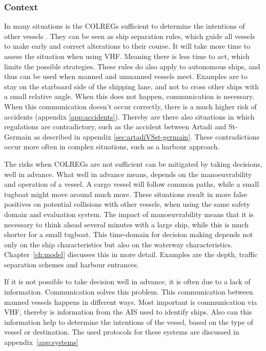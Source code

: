 \subsubsection*{Context}
In many situations is the \acf{COLREGs} sufficient to determine the intentions of other vessels \cite{IMO1972}. They can be seen as ship separation rules, which guide all vessels to make early and correct alterations to their course. It will take more time to assess the situation when using \ac{VHF}. Meaning there is less time to act, which limits the possible strategies. These rules do also apply to autonomous ships, and thus can be used when manned and unmanned vessels meet.
Examples are to stay on the starboard side of the shipping lane, and not to cross other ships with a small relative angle. When this does not happen, communication is necessary. When this communication doesn't occur correctly, there is a much higher risk of accidents (appendix \ref{app:accidents}). Thereby are there also situations in which regulations are contradictory, such as the accident between Artadi and St-Germain as described in appendix \ref{sec:artadiVSst-germain}. These contradictions occur more often in complex situations, such as a harbour approach.

The risks when \ac{COLREGs} are not sufficient can be mitigated by taking decisions, well in advance. What well in advance means, depends on the manoeuvrability and operation of a vessel. A cargo vessel will follow common paths, while a small tugboat might move around much more. These situations result in more false positives on potential collisions with other vessels, when using the same safety domain and evaluation system. The impact of manoeuvrability means that it is necessary to think ahead several minutes with a large ship, while this is much shorter for a small tugboat. This time-domain for decision making depends not only on the ship characteristics but also on the waterway characteristics. Chapter~\ref{ch:model} discusses this in more detail. Examples are the depth, traffic separation schemes and harbour entrances.

If it is not possible to take decision well in advance, it is often due to a lack of information. Communication solves this problem. This communication between manned vessels happens in different ways. Most important is communication via \ac{VHF}, thereby is information from the AIS used to identify ships. Also can this information help to determine the intentions of the vessel, based on the type of vessel or destination. The used protocols for these systems are discussed in appendix~\ref{app:systems}


